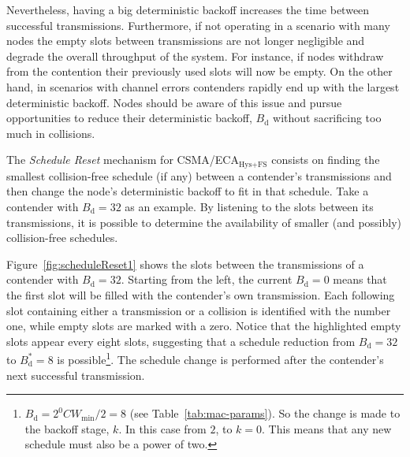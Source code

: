 	Nevertheless, having a big deterministic backoff increases the time between successful transmissions. Furthermore, if not operating in a scenario with many nodes the empty slots between transmissions are not longer negligible and degrade the overall throughput of the system. For instance, if nodes withdraw from the contention their previously used slots will now be empty. On the other hand, in scenarios with channel errors contenders rapidly end up with the largest deterministic backoff. Nodes should be aware of this issue and pursue opportunities to reduce their deterministic backoff, $B_{\text{d}}$ without sacrificing too much in collisions. 
	
	The \emph{Schedule Reset} mechanism for CSMA/ECA$_{\text{Hys+FS}}$ consists on finding the smallest collision-free schedule (if any) between a contender's transmissions and then change the node's deterministic backoff to fit in that schedule. Take a contender with $B_{\text{d}}=32$ as an example. By listening to the slots between its transmissions, it is possible to determine the availability of smaller (and possibly) collision-free schedules.
	
	Figure~\ref{fig:scheduleReset1} shows the slots between the transmissions of a contender with $B_{\text{d}}=32$. Starting from the left, the current $B_{\text{d}}=0$ means that the first slot will be filled with the contender's own transmission. Each following slot containing either a transmission or a collision is identified with the number one, while empty slots are marked with a zero. Notice that the highlighted empty slots appear every eight slots, suggesting that a schedule reduction from $B_{\text{d}}=32$ to $B_{\text{d}}^{*}=8$ is possible\footnote{$B_{\text{d}}=2^{0}CW_{\min}/2=8$ (see Table~\ref{tab:mac-params}). So the change is made to the backoff stage, $k$. In this case from $2$, to $k=0$. This means that any new schedule must also be a power of two.}. The schedule change is performed after the contender's next successful transmission.
	
